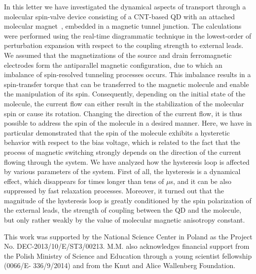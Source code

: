 \documentclass[doublecol]{epl2} %
\begin{document}
In this letter we have investigated the dynamical aspects of
transport through a molecular spin-valve device
consisting of a CNT-based  QD with an attached molecular magnet~\cite{Urdampilleta2011Jul},
embedded in a magnetic tunnel junction.
The calculations were performed using the real-time diagrammatic technique
in the lowest-order of perturbation expansion with respect to the coupling strength to external leads.
We assumed that the magnetizations of the source and drain
ferromagnetic electrodes form the antiparallel magnetic configuration,
due to  which an imbalance of spin-resolved tunneling processes occurs.
This imbalance results in a spin-transfer torque that can be transferred
to the magnetic molecule and enable the manipulation of its spin.
Consequently, depending on the initial state of the molecule,
the current flow can either result in the stabilization of the molecular spin
or cause its rotation. Changing the direction of the current
flow, it is thus possible to address the spin of the molecule in a desired manner.
Here, we have in particular demonstrated that the spin of the molecule exhibits a hysteretic behavior
with respect to the bias voltage,
which is related to the fact that the process of magnetic switching strongly depends
on the direction of the current flowing through the system.
We have analyzed how the hysteresis loop is affected by various parameters
of the system. First of all, the hysteresis is a dynamical effect,
which disappears for times longer than tens of $\mu$s, and it can be also
suppressed by fast relaxation processes.
Moreover, it turned out that the magnitude of the hysteresis loop 
is greatly conditioned by the spin polarization of the external leads,
the strength of coupling between the QD and the molecule,
but only rather weakly by the value of molecular magnetic anisotropy constant.


\acknowledgments
This work was supported by the National Science Center
in Poland as the Project No. DEC-2013/10/E/ST3/00213.
M.M. also acknowledges financial support from the Polish Ministry of Science
and Education through a young scientist fellowship (0066/E- 336/9/2014) and from the Knut and Alice Wallenberg Foundation.

\end{document}
